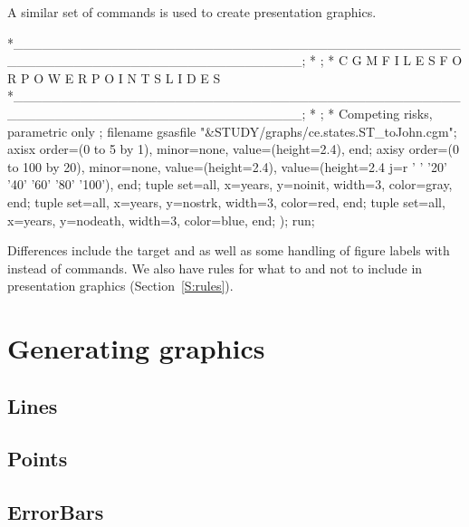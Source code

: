 \documentclass[nojss]{jss}\usepackage[]{graphicx}\usepackage[]{color}
\begin{document}
A similar set of  commands is used to create presentation graphics.

\begin{CodeChunk}\small
\begin{CodeInput}
*______________________________________________________________________________;
*                                                                              ;
*       C G M   F I L E S   F O R   P O W E R P O I N T   S L I D E S
*______________________________________________________________________________;
*                                                                              ;
* Competing risks, parametric only                                             ;
filename gsasfile "&STUDY/graphs/ce.states.ST_toJohn.cgm";
axisx order=(0 to 5 by 1), minor=none, value=(height=2.4), end;
axisy order=(0 to 100 by 20), minor=none, value=(height=2.4), 
value=(height=2.4 j=r ' ' '20' '40' '60' '80' '100'), end;
tuple set=all, x=years, y=noinit, width=3, color=gray, end;
tuple set=all, x=years, y=nostrk, width=3, color=red, end;
tuple set=all, x=years, y=nodeath, width=3, color=blue, end;
);
run;  
\end{CodeInput}
\end{CodeChunk}
Differences include the target  and  as well as some handling of figure labels with  instead of  commands. We also have rules for what to and not to include in presentation graphics (Section~\ref{S:rules}).

\section[Generating ggplot2 graphics]{Generating  graphics}\label{S:ggplot2tuple}

\subsection{Lines}\label{S:lines}

\subsection{Points}\label{S:points}


\subsection{ErrorBars}\label{S:errorbars}
\end{document}
